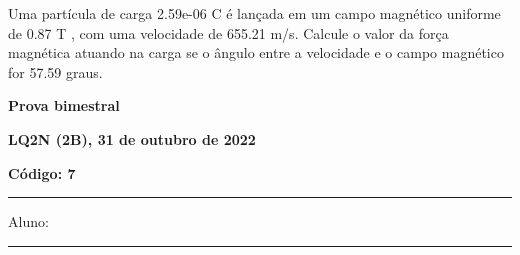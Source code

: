 \documentclass[12pt, addpoints]{exam}
\begin{document}
\begin{questions}
\begin{multicols*}{2}
\begin{oneparchoices}
\end{oneparchoices}
\question[20] Uma partícula de carga 2.59e-06 C é lançada em um campo magnético uniforme de    0.87 T , com uma velocidade de 655.21 m/s. Calcule o valor da força magnética atuando na carga se o ângulo entre a velocidade e o campo magnético for   57.59 graus.

\begin{oneparchoices}
\end{oneparchoices}
\end{multicols*}
\end{questions}
\newpage
        \begin{minipage}[b]{0.75\linewidth}
            \begin{flushleft}
                {\bf \large Prova bimestral}
            \end{flushleft}
            \begin{flushleft}
                {\bf \large LQ2N (2B), 31 de outubro de 2022}
            \end{flushleft}
        \end{minipage}
        \begin{minipage}[b]{0.20\linewidth}
            \begin{flushright}
                {\bf \large Código: 7}
            \end{flushright}
        \end{minipage}
        \vspace{0.5cm} \hrule \vspace{0.5cm}
        \begin{minipage}{0.75\linewidth}
            Aluno:
        \end{minipage}
        \vspace{0.5cm} \hrule \vspace{0.5cm}
\end{document}
